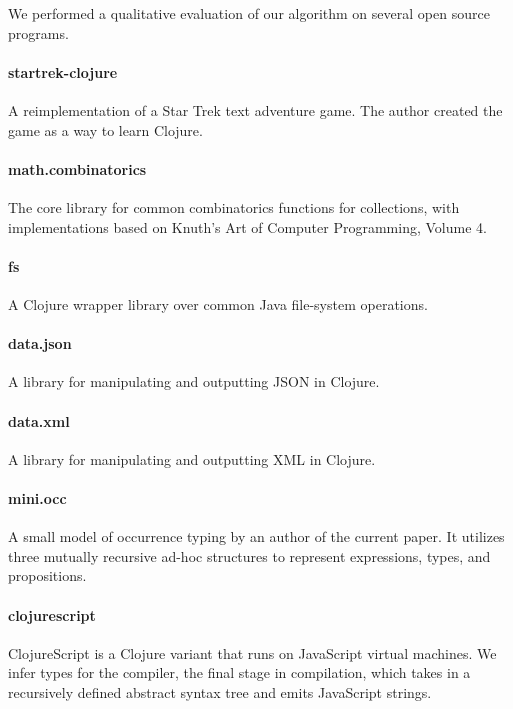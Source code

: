 
We performed a qualitative evaluation of our algorithm
on several open source programs.

\paragraph{startrek-clojure}
A reimplementation of a Star Trek text adventure game.
The author created the game as a way to learn
Clojure.

\paragraph{math.combinatorics}
The core library for common combinatorics functions
for collections,
with implementations based on Knuth's Art of Computer
Programming, Volume 4.

\paragraph{fs}
A Clojure wrapper library over common Java file-system operations.

\paragraph{data.json}
A library for manipulating and outputting JSON in Clojure.

\paragraph{data.xml}
A library for manipulating and outputting XML in Clojure.

\paragraph{mini.occ}
A small model of occurrence typing by an author of the
current paper. It utilizes three mutually recursive
ad-hoc structures to represent expressions, types,
and propositions.

\paragraph{clojurescript}
ClojureScript is a Clojure variant that runs on JavaScript
virtual machines. We infer types for the compiler, the final
stage in compilation, which takes in a recursively
defined abstract syntax tree and emits JavaScript strings.

